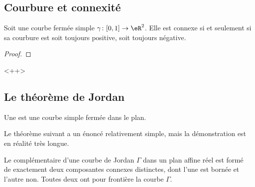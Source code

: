 \subsection{Courbure et connexité}

\begin{proposition}
    Soit une courbe fermée simple \( \gamma\colon \mathopen[ 0 , 1 \mathclose]\to \eR^2\). Elle est connexe si et seulement si sa courbure est soit toujours positive, soit toujours négative.
\end{proposition}

\begin{proof}
    
\end{proof}
<++>

\subsection{Le théorème de Jordan}

\begin{definition}
    Une  est une courbe simple fermée dans le plan.
\end{definition}

Le théorème suivant a un énoncé relativement simple, mais la démonstration est en réalité très longue.
\begin{theorem}
     Le complémentaire d'une courbe de Jordan \( \Gamma\) dans un plan affine réel est formé de exactement deux composantes connexes distinctes, dont l'une est bornée et l'autre non. Toutes deux ont pour frontière la courbe \( \Gamma\).
\end{theorem}

